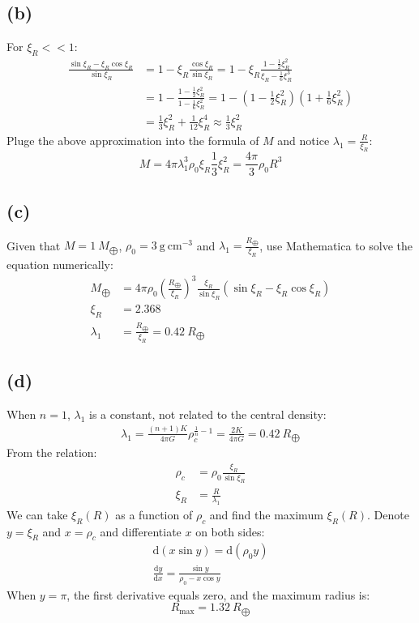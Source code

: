\documentclass[a4paper,12pt]{article}
\renewcommand{\d}{\mathrm{d}}
\newcommand{\cm}{\mathrm{cm}}
\newcommand{\g}{\mathrm{g}}
\begin{document}
\subsection*{(b)}
For $\xi_R << 1$:
\begin{align*}
    \frac{\sin \xi_R - \xi_R\cos \xi_R}{\sin \xi_R}
    &= 1 - \xi_R \frac{\cos \xi_R}{\sin \xi_R}
    = 1 - \xi_R \frac{1-\frac{1}{2} \xi_R^2}{\xi_R - \frac{1}{6} \xi_R^3} \\
    &= 1 - \frac{1-\frac{1}{2} \xi_R^2}{1-\frac{1}{6} \xi_R^2}
    = 1 - (1-\frac{1}{2} \xi_R^2)(1+\frac{1}{6} \xi_R^2) \\
    &= \frac{1}{3} \xi_R^2 + \frac{1}{12} \xi_R^4 \approx \frac{1}{3} \xi_R^2
\end{align*}
Pluge the above approximation into the formula of $M$ and notice $\lambda_1 = \frac{R}{\xi_R}$:
\begin{equation*}
    M = 4\pi \lambda_1^3 \rho_0 \xi_R \frac{1}{3} \xi_R^2 = \frac{4\pi}{3} \rho_0 R^3
\end{equation*}

\subsection*{(c)}
Given that $M = 1 \ M_{\bigoplus}$, $\rho_0 = 3 \ \g \ \cm^{-3}$ and $\lambda_1 = \frac{R_{\bigoplus}}{\xi_R}$, 
use Mathematica to solve the equation numerically:
\begin{align*}
    M_{\bigoplus} &= 4 \pi \rho_0 (\frac{R_{\bigoplus}}{\xi_R})^3 \frac{\xi_R}{\sin \xi_R} (\sin \xi_R - \xi_R \cos \xi_R) \\
    \xi_R &= 2.368 \\
    \lambda_1 &= \frac{R_{\bigoplus}}{\xi_R} = 0.42 \ R_{\bigoplus}
\end{align*}

\subsection*{(d)}
When $n=1$, $\lambda_1$ is a constant, not related to the central density:
\begin{align*}
    \lambda_1 = \frac{(n+1) K}{4\pi G} \rho_c^{\frac{1}{n} - 1} = \frac{2 K}{4\pi G} = 0.42 \ R_{\bigoplus}
\end{align*}
From the relation:
\begin{align*}
    \rho_c &= \rho_0 \frac{\xi_R}{\sin \xi_R} \\
    \xi_R &= \frac{R}{\lambda_1} 
\end{align*}
We can take $\xi_R (R)$ as a function of $\rho_c$ and find the maximum $\xi_R (R)$.
Denote $y=\xi_R$ and $x = \rho_c$ and differentiate $x$ on both sides:
\begin{align*}
    \d(x \sin y) = \d(\rho_0 y) \\
    \frac{\d y}{\d x} = \frac{\sin y}{\rho_0 - x\cos y}
\end{align*}
When $y=\pi$, the first derivative equals zero, and the maximum radius is:
\begin{equation*}
    R_{\text{max}} = 1.32 \ R_{\bigoplus}
\end{equation*}
\end{document}

